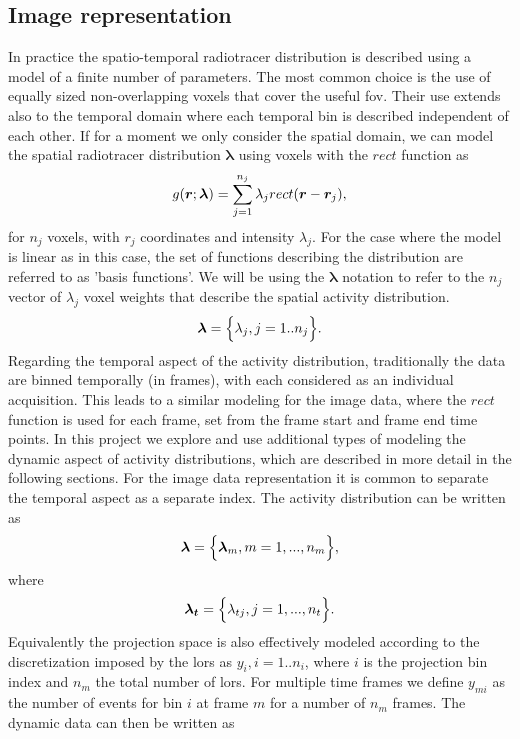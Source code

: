 \subsection{Image representation}
In practice the spatio-temporal radiotracer distribution is described using a model of a finite number of parameters. The most common choice is the use of equally sized non-overlapping voxels that cover the useful \gls{fov}. Their use extends also to the temporal domain where each temporal bin is described independent of each other. 
If for a moment we only consider the spatial domain, we can model the spatial radiotracer distribution $\bm{\lambda}$ using voxels with the  $rect$ function as
\begin{equation}
   g(\bm{r};\bm\lambda) = \sum_{j=1}^{n_{j}} \lambda_j {rect}(\bm{r}-\bm{r}_j)  \\, 
\end{equation}
for ${n_{j}}$ voxels, with $r_j$ coordinates and intensity $\lambda_j$.
For the case where the model is linear as in this case, the set of functions describing the distribution are referred to as 'basis functions'. We will be using the $\bm\lambda$ notation to refer to the ${n_{j}}$ vector of  $\lambda_j$ voxel weights that describe the spatial activity distribution. 
\begin{equation}
   \bm\lambda = \Big\{ \lambda_j,j=1..n_j \Big\} \\.
\end{equation}
Regarding the temporal aspect of the activity distribution, traditionally the data are binned temporally (in frames), with each considered as an individual acquisition. This leads to a similar modeling for the image data, where the $rect$ function is used for each frame, set from the frame start and frame end time points. In this project we explore and use additional types of modeling the dynamic aspect of activity distributions, which are described in more detail in the following sections. For the image data representation it is common to separate the temporal aspect as a separate index. The activity distribution can be written as
\begin{equation}
   \bm{\lambda} = \Big\{ {\bm{\lambda}_m,m=1,...,n_m} \Big\} \\,
\end{equation}
where
\begin{equation}
   \bm{\lambda_t} = \Big\{ {\lambda_{tj},j=1,...,n_t} \Big\} \\.
\end{equation}
Equivalently the projection space is also effectively modeled according to the discretization imposed by the \glspl{lor} as $y_i,i=1..n_i$, where $i$ is the projection bin index and $n_m$ the total number of \glspl{lor}. For multiple time frames we define $y_{mi}$ as the number of events for bin $i$ at frame $m$ for a number of $n_m$ frames. The dynamic data can then be written as
